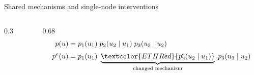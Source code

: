 \documentclass[11pt,aspectratio=169]{beamer}
\newcommand{\red}[1]{\textcolor{ETHRed}{#1}}
\begin{document}
\begin{frame}{Shared mechanisms and single-node interventions}
	\begin{columns}[onlytextwidth]
		\begin{column}{0.3\textwidth}
			\centering
		\end{column}
		\begin{column}{0.68\textwidth}
			\begin{align*}
				p(u) &= p_1(u_1)\; p_2(u_2 \mid u_1)\; p_3(u_3 \mid u_2) \\[1mm]
				p^e(u) &= p_1(u_1)\; \underbrace{\red{p_2^e(u_2 \mid u_1)}}_{\text{changed mechanism}}\; p_3(u_3 \mid u_2)
			\end{align*}
		\end{column}
	\end{columns}
\end{frame}
\end{document}
